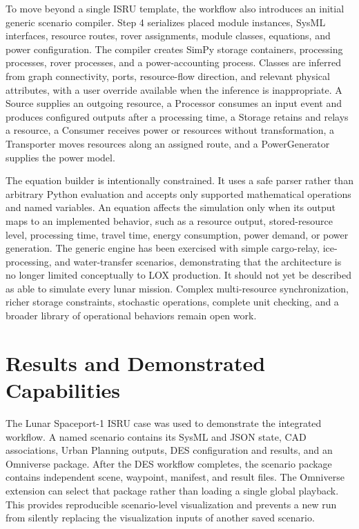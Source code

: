 To move beyond a single ISRU template, the workflow also introduces an initial generic scenario compiler. Step 4 serializes placed module instances, SysML interfaces, resource routes, rover assignments, module classes, equations, and power configuration. The compiler creates SimPy storage containers, processing processes, rover processes, and a power-accounting process. Classes are inferred from graph connectivity, ports, resource-flow direction, and relevant physical attributes, with a user override available when the inference is inappropriate. A Source supplies an outgoing resource, a Processor consumes an input event and produces configured outputs after a processing time, a Storage retains and relays a resource, a Consumer receives power or resources without transformation, a Transporter moves resources along an assigned route, and a PowerGenerator supplies the power model.

The equation builder is intentionally constrained. It uses a safe parser rather than arbitrary Python evaluation and accepts only supported mathematical operations and named variables. An equation affects the simulation only when its output maps to an implemented behavior, such as a resource output, stored-resource level, processing time, travel time, energy consumption, power demand, or power generation. The generic engine has been exercised with simple cargo-relay, ice-processing, and water-transfer scenarios, demonstrating that the architecture is no longer limited conceptually to LOX production. It should not yet be described as able to simulate every lunar mission. Complex multi-resource synchronization, richer storage constraints, stochastic operations, complete unit checking, and a broader library of operational behaviors remain open work.

\section{Results and Demonstrated Capabilities}

The Lunar Spaceport-1 ISRU case was used to demonstrate the integrated workflow. A named scenario contains its SysML and JSON state, CAD associations, Urban Planning outputs, DES configuration and results, and an Omniverse package. After the DES workflow completes, the scenario package contains independent scene, waypoint, manifest, and result files. The Omniverse extension can select that package rather than loading a single global playback. This provides reproducible scenario-level visualization and prevents a new run from silently replacing the visualization inputs of another saved scenario.

